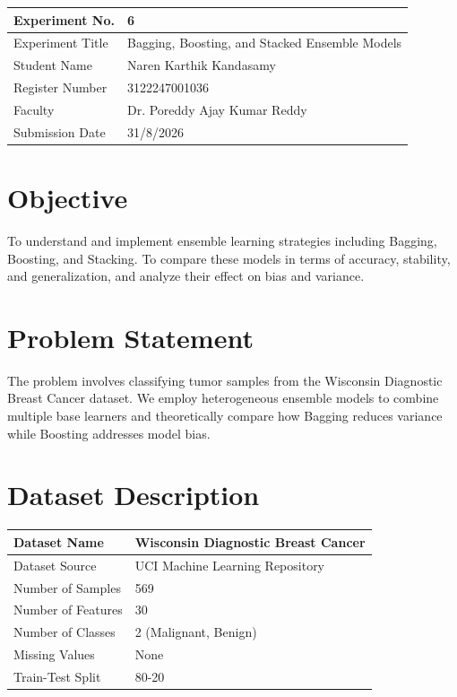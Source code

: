 \documentclass[12pt,a4paper]{article}
\begin{document}
\begin{tabular}{|p{4cm}|p{11cm}|}
\hline
Experiment No. & 6 \\ \hline
Experiment Title & Bagging, Boosting, and Stacked Ensemble Models \\ \hline

Student Name & Naren Karthik Kandasamy \\ \hline
Register Number & 3122247001036 \\ \hline
Faculty & Dr. Poreddy Ajay Kumar Reddy \\ \hline
Submission Date & 31/8/2026 \\ \hline
\end{tabular}

\section{Objective}
To understand and implement ensemble learning strategies including Bagging, Boosting, and Stacking. To compare these models in terms of accuracy, stability, and generalization, and analyze their effect on bias and variance.

\section{Problem Statement}
The problem involves classifying tumor samples from the Wisconsin Diagnostic Breast Cancer dataset. We employ heterogeneous ensemble models to combine multiple base learners and theoretically compare how Bagging reduces variance while Boosting addresses model bias.

\section{Dataset Description}
\begin{longtable}{|p{6cm}|p{8cm}|}
\hline
Dataset Name & Wisconsin Diagnostic Breast Cancer \\ \hline
Dataset Source & UCI Machine Learning Repository \\ \hline
Number of Samples & 569 \\ \hline
Number of Features & 30 \\ \hline
Number of Classes & 2 (Malignant, Benign) \\ \hline
Missing Values & None \\ \hline
Train-Test Split & 80-20 \\ \hline
\end{longtable}
\end{document}
